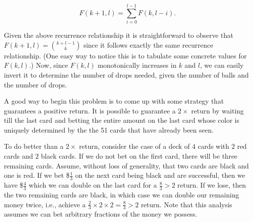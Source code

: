 \[F(k+1,l) = \sum_{i=0}^{l-1} F(k, l-i) . \]

Given the above recurrence relationship it is straightforward to
observe that $F(k+1,l)   = \binom{ k + l  -1}{k}$ since it follows
exactly the same recurrence relationship. (One easy way to notice this is to
tabulate some concrete values for $F(k,l)$.)  Now, since $F(k,l)$ monotonically
increases in $k$ and $l$, we can easily invert it to determine the number of
drops needed, given the number of balls and the number of drops.

A good way to begin this problem is to come up with some strategy
that guarantees a positive return. It is possible to guarantee a $2\times$
return by 
waiting till the last card and betting the entire amount
on the last card whose color is uniquely determined by the 
the 51 cards that have already been seen.

To do better than a $2\times$ return, consider the case of a deck of
$4$ cards with $2$ red cards and $2$ black cards.  If we do not bet
on the first card, there will be three remaining cards. Assume, without loss of generality, that two cards are black and one is red. If we bet \$$\frac{1}{3}$ on the next card being black and are successful,
then we have \$$\frac{4}{3}$ which we can double on the last card for
a $\frac{8}{3} > 2$ return. If we lose, then the two remaining cards are black, 
in which case we can double our remaining money twice, i.e., achieve
a $\frac{2}{3} \times 2 \times 2 = \frac{8}{3} > 2$ return.
Note that this analysis assumes we can bet arbitrary fractions of the money 
we possess.


